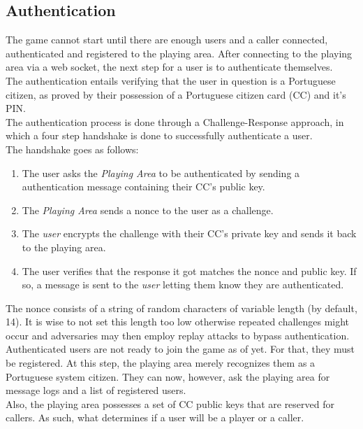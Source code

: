 \documentclass[11pt]{article}
\begin{document}
\subsection{Authentication}
The game cannot start until there are enough users and a caller connected, authenticated and registered to the playing area. After connecting to the playing area via a web socket, the next step for a user is to authenticate themselves. \\
The authentication entails verifying that the user in question is a Portuguese citizen, as proved by their possession of a Portuguese citizen card (CC) and it’s PIN. \\ The authentication process is done through a Challenge-Response approach, in which a four step handshake is done to successfully authenticate a user.
\\ The handshake goes as follows:

\begin{enumerate}
  \item The user asks the \emph{Playing Area} to be authenticated by sending a authentication message containing their CC’s public key.
  \item The \emph{Playing Area} sends a nonce to the user as a challenge.
  \item The \emph{user} encrypts the challenge with their CC’s private key and sends it back to the playing area.
  \item The user verifies that the response it got matches the nonce and public key. If so, a message is sent to the \emph{user} letting them know they are authenticated.
\end{enumerate}
The nonce consists of a string of random characters of variable length (by default, 14). It is wise to not set this length too low otherwise repeated challenges might occur and adversaries may then employ replay attacks to bypass authentication. \\ Authenticated users are not ready to join the game as of yet. For that, they must be registered. At this step, the playing area merely recognizes them as a Portuguese system citizen. They can now, however, ask the playing area for message logs and a list of registered users. \\ Also, the playing area possesses a set of CC public keys that are reserved for callers. As such, what determines if a user will be a player or a caller.
\end{document}
